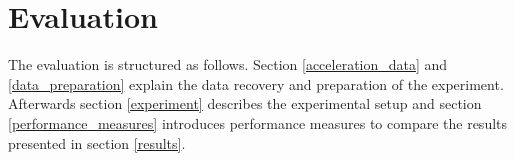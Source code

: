 \section{Evaluation} \label{evaluation}

The evaluation is structured as follows. Section \ref{acceleration_data} and \ref{data_preparation} explain the data
recovery and preparation of the experiment. Afterwards section \ref{experiment} describes the experimental setup and
section \ref{performance_measures} introduces performance measures to compare the results presented in section
\ref{results}.







